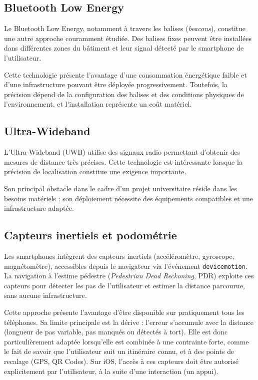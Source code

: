 \documentclass[12pt,a4paper]{report}
\begin{document}
\subsection{Bluetooth Low Energy}

Le Bluetooth Low Energy, notamment à travers les balises (\emph{beacons}), constitue une autre
approche couramment étudiée. Des balises fixes peuvent être installées dans différentes zones du
bâtiment et leur signal détecté par le smartphone de l'utilisateur.

Cette technologie présente l'avantage d'une consommation énergétique faible et d'une
infrastructure pouvant être déployée progressivement. Toutefois, la précision dépend de la
configuration des balises et des conditions physiques de l'environnement, et l'installation
représente un coût matériel.

\subsection{Ultra-Wideband}

L'Ultra-Wideband (UWB) utilise des signaux radio permettant d'obtenir des mesures de distance
très précises. Cette technologie est intéressante lorsque la précision de localisation constitue
une exigence importante.

Son principal obstacle dans le cadre d'un projet universitaire réside dans les besoins matériels :
son déploiement nécessite des équipements compatibles et une infrastructure adaptée.

\subsection{Capteurs inertiels et podométrie}

Les smartphones intègrent des capteurs inertiels (accéléromètre, gyroscope, magnétomètre),
accessibles depuis le navigateur via l'événement \texttt{devicemotion}. La navigation à l'estime
pédestre (\emph{Pedestrian Dead Reckoning}, PDR) exploite ces capteurs pour détecter les pas de
l'utilisateur et estimer la distance parcourue, sans aucune infrastructure.

Cette approche présente l'avantage d'être disponible sur pratiquement tous les téléphones. Sa
limite principale est la dérive : l'erreur s'accumule avec la distance (longueur de pas variable,
pas manqués ou détectés à tort). Elle est donc particulièrement adaptée lorsqu'elle est combinée à
une contrainte forte, comme le fait de savoir que l'utilisateur suit un itinéraire connu, et à des
points de recalage (GPS, QR Codes). Sur iOS, l'accès à ces capteurs doit être autorisé
explicitement par l'utilisateur, à la suite d'une interaction (un appui).
\end{document}
